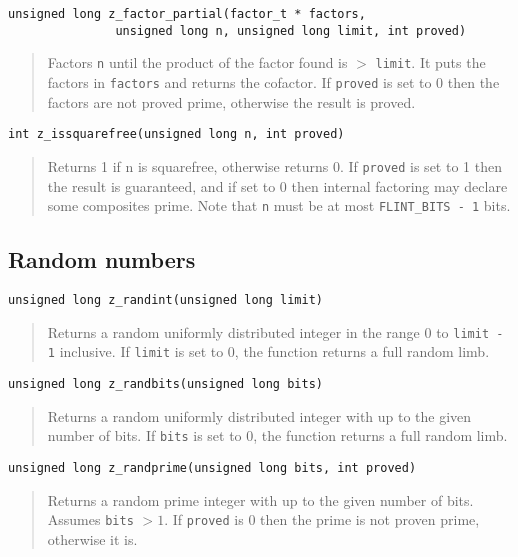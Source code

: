 \documentclass[a4paper,10pt]{article}
\newcommand{\code}{\lstinline}
\begin{document}
\begin{lstlisting}
unsigned long z_factor_partial(factor_t * factors,
               unsigned long n, unsigned long limit, int proved)
\end{lstlisting}
\begin{quote}
Factors \code{n} until the product of the factor found is $>$ \code{limit}. It puts the factors in \code{factors} and returns the cofactor.  If \code{proved} is set to 0 then the factors are not proved prime, otherwise the result is proved.
\end{quote}

\begin{lstlisting}
int z_issquarefree(unsigned long n, int proved)
\end{lstlisting}
\begin{quote}
Returns 1 if n is squarefree, otherwise returns 0. If \code{proved} is set to 1 then the result is guaranteed, and if set to 0 then internal factoring may declare some composites prime. Note that \code{n} must be at most \code{FLINT_BITS - 1} bits.
\end{quote}

\subsection{Random numbers}

\begin{lstlisting}
unsigned long z_randint(unsigned long limit)
\end{lstlisting}
\begin{quote}
Returns a random uniformly distributed integer in the range 0 to \code{limit - 1} inclusive. If \code{limit} is set to 0, the function returns a full random limb.
\end{quote}
 
\begin{lstlisting}
unsigned long z_randbits(unsigned long bits)
\end{lstlisting}
\begin{quote}
Returns a random uniformly distributed integer with up to the given number of bits. If \code{bits} is set to 0, the function returns a full random limb.
\end{quote}

\begin{lstlisting}
unsigned long z_randprime(unsigned long bits, int proved)
\end{lstlisting}
\begin{quote}
Returns a random prime integer with up to the given number of bits.  Assumes \code{bits} $> 1$. If \code{proved} is 0 then the prime is not proven prime, otherwise it is.
\end{quote}
\end{document}
